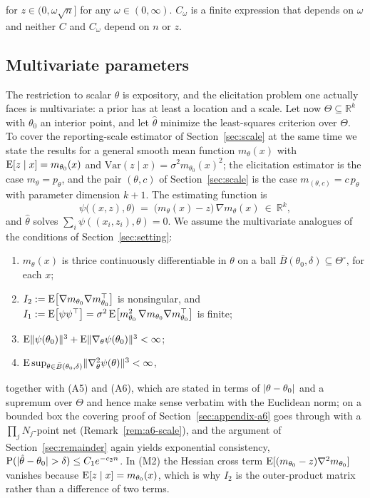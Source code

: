 for $z\in (0,\omega \sqrt{n}]$ for any $\omega\in (0,\infty)$. $C_{\omega}$ is a finite expression that depends on $\omega$ and neither $C$ and $C_{\omega}$ depend on $n$ or $z$.

\subsection{Multivariate parameters}
\label{sec:multivariate}

The restriction to scalar $\theta$ is expository, and the elicitation problem one actually faces is multivariate: a prior has at least a location and a scale. Let now $\Theta\subseteq\mathbb{R}^{k}$ with $\theta_{0}$ an interior point, and let $\hat\theta$ minimize the least-squares criterion over $\Theta$. To cover the reporting-scale estimator of Section~\ref{sec:scale} at the same time we state the results for a general smooth mean function $m_{\theta}(x)$ with $\mathrm{E}[z\mid x]=m_{\theta_{0}}(x)$ and $\mathrm{Var}(z\mid x)=\sigma^{2}m_{\theta_{0}}(x)^{2}$; the elicitation estimator is the case $m_{\theta}=p_{\theta}$, and the pair $(\theta,c)$ of Section~\ref{sec:scale} is the case $m_{(\theta,c)}=c\,p_{\theta}$ with parameter dimension $k+1$. The estimating function is
\[
\psi\big((x,z),\theta\big)\;=\;\big(m_{\theta}(x)-z\big)\,\nabla m_{\theta}(x)\ \in\ \mathbb{R}^{k},
\]
and $\hat\theta$ solves $\sum_{i}\psi((x_{i},z_{i}),\theta)=0$. We assume the multivariate analogues of the conditions of Section~\ref{sec:setting}:
\begin{enumerate}
	\item[(M1)] $m_{\theta}(x)$ is thrice continuously differentiable in $\theta$ on a ball $\bar B(\theta_{0},\delta)\subseteq\Theta^{\circ}$, for each $x$;
	\item[(M2)] $I_{2}:=\mathrm{E}\big[\nabla m_{\theta_{0}}\nabla m_{\theta_{0}}^{\top}\big]$ is nonsingular, and $I_{1}:=\mathrm{E}\big[\psi\psi^{\top}\big]=\sigma^{2}\,\mathrm{E}\big[m_{\theta_{0}}^{2}\,\nabla m_{\theta_{0}}\nabla m_{\theta_{0}}^{\top}\big]$ is finite;
	\item[(M3)] $\mathrm{E}\lVert\psi(\theta_{0})\rVert^{3}+\mathrm{E}\lVert\nabla_{\theta}\psi(\theta_{0})\rVert^{3}<\infty$;
	\item[(M4)] $\mathrm{E}\sup_{\theta\in\bar B(\theta_{0},\delta)}\lVert\nabla^{2}_{\theta}\psi(\theta)\rVert^{3}<\infty$,
\end{enumerate}
together with (A5) and (A6), which are stated in terms of $\lvert\theta-\theta_{0}\rvert$ and a supremum over $\Theta$ and hence make sense verbatim with the Euclidean norm; on a bounded box the covering proof of Section~\ref{sec:appendix-a6} goes through with a $\prod_{j}N_{j}$-point net (Remark~\ref{rem:a6-scale}), and the argument of Section~\ref{sec:remainder} again yields exponential consistency, $\mathrm{P}(\lvert\hat\theta-\theta_{0}\rvert>\delta)\le C_{1}e^{-c_{2}n}$. In (M2) the Hessian cross term $\mathrm{E}[(m_{\theta_{0}}-z)\nabla^{2}m_{\theta_{0}}]$ vanishes because $\mathrm{E}[z\mid x]=m_{\theta_{0}}(x)$, which is why $I_{2}$ is the outer-product matrix rather than a difference of two terms.

